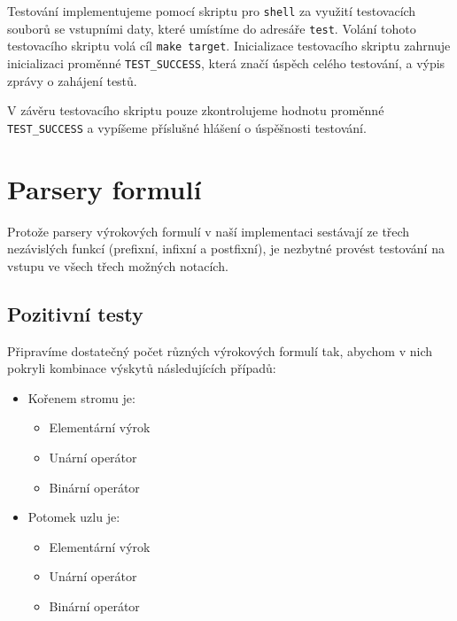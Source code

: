 \documentclass[thesis=B,czech,hidelinks]{FITthesis}[2012/06/26]
\begin{document}
Testování implementujeme pomocí skriptu pro \texttt{shell} za využití testovacích souborů se vstupními daty, které umístíme do adresáře \texttt{test}. Volání tohoto testovacího skriptu volá cíl \texttt{make target}. Inicializace testovacího skriptu zahrnuje inicializaci proměnné \texttt{TEST\_SUCCESS}, která značí úspěch celého testování, a výpis zprávy o zahájení testů.



V závěru testovacího skriptu pouze zkontrolujeme hodnotu proměnné \texttt{TEST\_SUCCESS} a vypíšeme příslušné hlášení o úspěšnosti testování.



\section{Parsery formulí}

Protože parsery výrokových formulí v naší implementaci sestávají ze třech nezávislých funkcí (prefixní, infixní a postfixní), je nezbytné provést testování na vstupu ve všech třech možných notacích. 

\subsection{Pozitivní testy}

Připravíme dostatečný počet různých výrokových formulí tak, abychom v nich pokryli kombinace výskytů následujících případů:

\begin{itemize}
	\item Kořenem stromu je:
	\begin{itemize}
		\item Elementární výrok
		\item Unární operátor
		\item Binární operátor
	\end{itemize}
	\item Potomek uzlu je:
	\begin{itemize}
		\item Elementární výrok
		\item Unární operátor
		\item Binární operátor
	\end{itemize}
\end{itemize}
\end{document}
